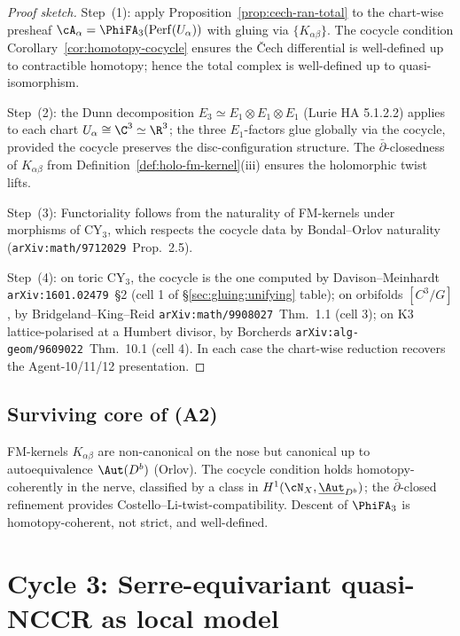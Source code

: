 \begin{proof}[Proof sketch]
Step~(1): apply Proposition~\ref{prop:cech-ran-total} to the
chart-wise presheaf $\cA_\alpha = \PhiFA_3(\mathrm{Perf}(U_\alpha))$
with gluing via $\{K_{\alpha\beta}\}$. The cocycle condition
Corollary~\ref{cor:homotopy-cocycle} ensures the Čech differential is
well-defined up to contractible homotopy; hence the total complex is
well-defined up to quasi-isomorphism.

Step~(2): the Dunn decomposition $E_3 \simeq E_1 \otimes E_1 \otimes
E_1$ (Lurie HA 5.1.2.2) applies to each chart
$U_\alpha \cong \C^3 \simeq \R^3$; the three $E_1$-factors glue
globally via the cocycle, provided the cocycle preserves the
disc-configuration structure. The $\bar\partial$-closedness of
$K_{\alpha\beta}$ from Definition~\ref{def:holo-fm-kernel}(iii)
ensures the holomorphic twist lifts.

Step~(3): Functoriality follows from the naturality of FM-kernels
under morphisms of CY$_3$, which respects the cocycle data by
Bondal--Orlov naturality (\texttt{arXiv:math/9712029}~Prop.~2.5).

Step~(4): on toric CY$_3$, the cocycle is the one computed by
Davison--Meinhardt \texttt{arXiv:1601.02479}~\S 2 (cell 1 of
\S\ref{sec:gluing:unifying} table); on orbifolds $[C^3/G]$, by
Bridgeland--King--Reid \texttt{arXiv:math/9908027}~Thm.~1.1 (cell 3);
on K3 lattice-polarised at a Humbert divisor, by
Borcherds \texttt{arXiv:alg-geom/9609022}~Thm.~10.1 (cell 4). In each
case the chart-wise reduction recovers the Agent-10/11/12 presentation.
\end{proof}

\subsection*{Surviving core of (A2)}

FM-kernels $K_{\alpha\beta}$ are non-canonical on the nose but
canonical up to autoequivalence $\Aut(D^b)$ (Orlov). The cocycle
condition holds homotopy-coherently in the nerve, classified by a
class in $H^1(\cN_X, \underline{\Aut}_{D^b})$; the $\bar\partial$-closed
refinement provides Costello--Li-twist-compatibility. Descent of
$\PhiFA_3$ is homotopy-coherent, not strict, and well-defined.

\section{Cycle 3: Serre-equivariant quasi-NCCR as local model}

